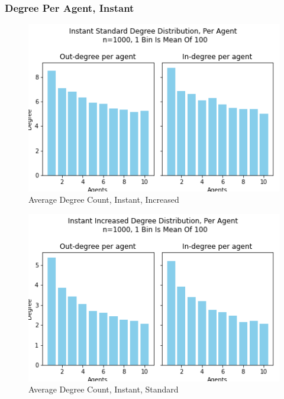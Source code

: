 \documentclass{article}
\begin{document}
\subsubsection{Degree Per Agent, Instant}
\begin{center}
    \begin{figure}[!htbp]
        \centering
        \includegraphics[width=.8\textwidth]{ThesisKI/Images/IncreasedPerAgentInstant.png}
        \caption{Average Degree Count, Instant, Increased}
        \label{DPA:InsInc}
    \end{figure}
\end{center}
\begin{center}
    \begin{figure}[!htbp]
        \centering
        \includegraphics[width=.8\textwidth]{ThesisKI/Images/StandardPerAgentInstant.png}
        \caption{Average Degree Count, Instant, Standard}
        \label{DPA:InsStd}
    \end{figure}
\end{center}
\newpage
\end{document}
